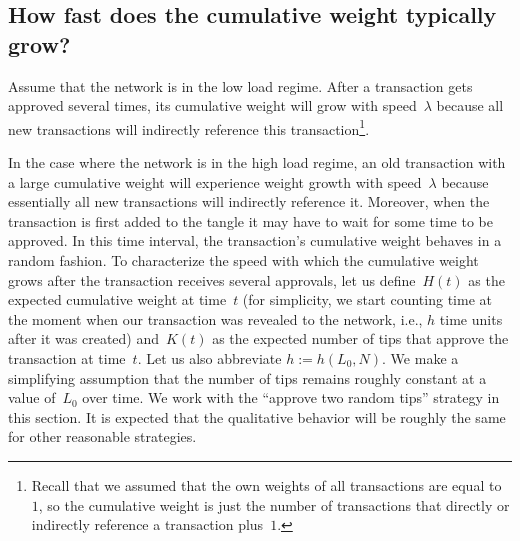 \documentclass[12pt]{article}
\begin{document}
\begin{CJK}{UTF8}{bkai}
\subsection{How fast does the cumulative weight typically grow?}
\label{s_cum_grow}

Assume that the network is in the low load regime. 
After a transaction gets approved several times, 
its cumulative weight will grow 
with speed~$\lambda$ 
because all new transactions
will indirectly reference this 
transaction\footnote{Recall that we assumed that
the own weights of all transactions are equal to~$1$,
so the cumulative weight is just the number of transactions
that directly or indirectly reference a transaction
plus~$1$.}.

In the case where the network is in the high load regime, an 
old transaction with a large cumulative weight will experience 
weight growth 
with speed~$\lambda$ 
because essentially 
all new transactions will indirectly reference it.
Moreover, when the transaction is first added to the tangle it may have 
to wait for some time to be approved. In this time interval, the 
transaction's cumulative weight behaves in a random fashion.
To characterize the speed with which the cumulative weight 
grows after the 
transaction receives several approvals, let us define~$H(t)$
 as the expected cumulative weight at time~$t$ 
(for simplicity, 
we start counting time at the moment when
 our transaction was revealed to the network, i.e.,
$h$ time units after it was created)
 and~$K(t)$ as the expected number of
 tips that approve the transaction at time~$t$.
Let us also abbreviate $h:=h(L_0,N)$. 
We make a simplifying
assumption that the number of tips remains roughly
constant at a value of~$L_0$ over time. 
We work with the ``approve two random tips'' strategy in this section. 
It is expected that the qualitative behavior will be roughly the same for 
other reasonable strategies. 


\end{CJK}
\end{document}
